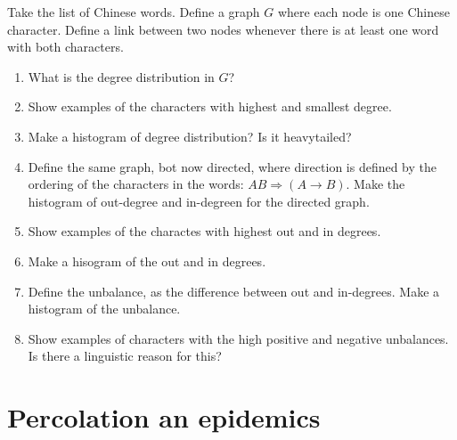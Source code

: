 Take the list of Chinese words. Define a graph $G$ where each node is one Chinese character. Define a link between two nodes whenever there is at least one word with both characters.
\begin{enumerate}
 \item What is the degree distribution in $G$?
 \item Show examples of the characters with highest and smallest degree.
 \item Make a histogram of degree distribution? Is it heavytailed?
 \item Define the same graph, bot now directed, where direction is defined by the ordering of the characters in the words: $AB \Rightarrow (A\to B)$. Make the histogram of out-degree and in-degreen for the directed graph.
 \item Show examples of the charactes with highest out and in degrees.
 \item Make a hisogram of the out and in degrees.
 \item Define the unbalance, as the difference between out and in-degrees. Make a histogram of the unbalance.
 \item Show examples of characters with the high positive and negative unbalances. Is there a linguistic reason for this?
\end{enumerate}


\section{Percolation an epidemics}



